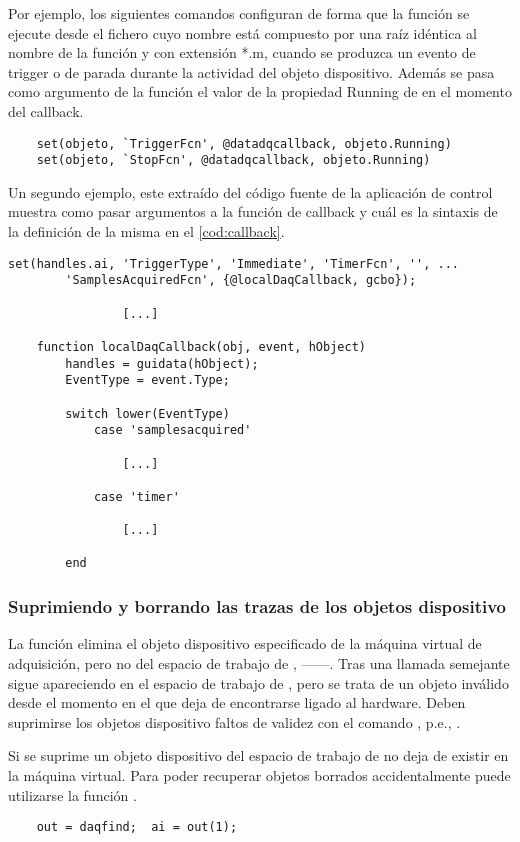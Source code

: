 Por ejemplo, los siguientes comandos configuran  de forma que
la función  se ejecute desde el fichero cuyo nombre
está compuesto por una raíz idéntica al nombre de la función y con
extensión *.m, cuando se produzca un evento de trigger o de parada durante
la actividad del objeto dispositivo. Además se pasa como argumento de la
función el valor de la propiedad \textsf{Running} de  en el
momento del callback.

\begin{lstlisting}
	set(objeto, `TriggerFcn', @datadqcallback, objeto.Running)
	set(objeto, `StopFcn', @datadqcallback, objeto.Running)
\end{lstlisting}

Un segundo ejemplo, este extraído del código fuente de la aplicación de
control muestra como pasar argumentos a la función de callback y cuál es la
sintaxis de la definición de la misma en el \cref{cod:callback}.

\begin{lstlisting}[style=displayed, caption={[Configuración de
	\emph{callback}]{Configuración de \emph{callback} para responder a
	eventos en la sesión de muestreo, la función de \emph{callback}
	recibe un argumento.}}, label={cod:callback}]
	set(handles.ai, 'TriggerType', 'Immediate', 'TimerFcn', '', ...
		'SamplesAcquiredFcn', {@localDaqCallback, gcbo});

				[...]

	function localDaqCallback(obj, event, hObject)
		handles = guidata(hObject);
		EventType = event.Type;

		switch lower(EventType)
			case 'samplesacquired'

				[...]

			case 'timer'

				[...]

		end
\end{lstlisting}

\subsubsection{Suprimiendo y borrando las trazas de los objetos dispositivo}

La función  elimina el objeto dispositivo especificado de la
máquina virtual de adquisición, pero no del espacio de trabajo de
\matlab{}, ------. Tras una llamada semejante
 sigue apareciendo en el espacio de trabajo de \matlab{}, pero
se trata de un objeto inválido desde el momento en el que deja de
encontrarse ligado al hardware. Deben suprimirse los objetos dispositivo
faltos de validez con el comando , p.e., .

Si se suprime un objeto dispositivo del espacio de trabajo de \matlab{} no
deja de existir en la máquina virtual. Para poder recuperar objetos
borrados accidentalmente puede utilizarse la función .

\begin{lstlisting}
	out = daqfind;	ai = out(1);
\end{lstlisting}
